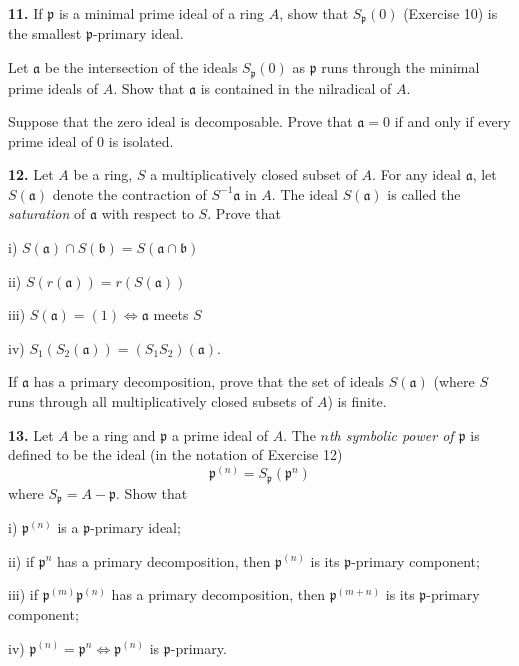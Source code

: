 
\noindent\textbf{11.} If $\mathfrak p$ is a minimal prime ideal of a ring $A$, show that $S_\mathfrak p(0)$ (Exercise 10) is the
smallest $\mathfrak p$-primary ideal.

Let $\mathfrak a$ be the intersection of the ideals $S_\mathfrak p(0)$ as $\mathfrak p$ runs through the minimal
prime ideals of $A$.  Show that $\mathfrak a$ is contained in the nilradical of $A$.

Suppose that the zero ideal is decomposable.  Prove that $\mathfrak a=0$ if and only if
every prime ideal of 0 is isolated.

\medskip
\noindent\textbf{12.} Let $A$ be a ring, $S$ a multiplicatively closed subset of $A$.  For any ideal $\mathfrak a$, let $S(\mathfrak a)$
denote the contraction of $S^{-1}\mathfrak a$ in $A$.  The ideal $S(\mathfrak a)$ is called the \emph{saturation} of $\mathfrak a$
with respect to $S$.  Prove that

i) $S(\mathfrak a)\cap S(\mathfrak b)=S(\mathfrak a\cap\mathfrak b)$

ii) $S(r(\mathfrak a))=r(S(\mathfrak a))$

iii) $S(\mathfrak a)=(1)\Longleftrightarrow\mathfrak a$ meets $S$

iv) $S_1(S_2(\mathfrak a))=(S_1S_2)(\mathfrak a)$.

If $\mathfrak a$ has a primary decomposition, prove that the set of ideals $S(\mathfrak a)$ (where $S$ runs
through all multiplicatively closed subsets of $A$) is finite.

\medskip
\noindent\amstar\textbf{13.} Let $A$ be a ring and $\mathfrak p$ a prime ideal of $A$.  The \emph{$n$th symbolic power of $\mathfrak p$} is defined
to be the ideal (in the notation of Exercise 12)
\[
\mathfrak p^{(n)}=S_\mathfrak p(\mathfrak p^n)
\]
where $S_\mathfrak p=A-\mathfrak p$.  Show that

i) $\mathfrak p^{(n)}$ is a $\mathfrak p$-primary ideal;

ii) if $\mathfrak p^n$ has a primary decomposition, then $\mathfrak p^{(n)}$ is its $\mathfrak p$-primary component;

iii) if $\mathfrak p^{(m)}\mathfrak p^{(n)}$ has a primary decomposition, then $\mathfrak p^{(m+n)}$ is its $\mathfrak p$-primary component;

iv) $\mathfrak p^{(n)}=\mathfrak p^n\Longleftrightarrow\mathfrak p^{(n)}$ is $\mathfrak p$-primary.

